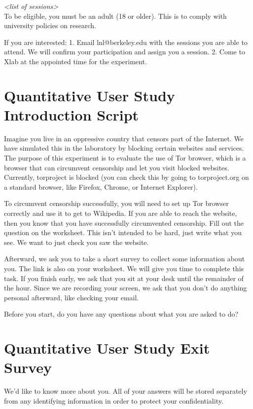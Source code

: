 \documentclass[USenglish,oneside,twocolumn]{article}
\begin{document}
\textit{<list of sessions>}\\

To be eligible, you must be an adult (18 or older). This is to comply with university policies on research. 

If you are interested: 1. Email lnl@berkeley.edu with the sessions you are able to attend. We will confirm your participation and assign you a session. 2. Come to Xlab at the appointed time for the experiment.

\section{Quantitative User Study Introduction Script} 
\label{quantitative-script} 
Imagine you live in an oppressive country that censors part of the Internet. We have simulated this in the laboratory by blocking certain websites and services.  The purpose of this experiment is to evaluate the use of Tor browser, which is a browser that can circumvent censorship and let you visit blocked websites. Currently, torproject is blocked (you can check this by going to torproject.org on a standard browser, like Firefox, Chrome, or Internet Explorer). 

To circumvent censorship successfully, you will need to set up Tor browser correctly and use it to get to Wikipedia. If you are able to reach the website, then you know that you have successfully circumvented censorship. Fill out the question on the worksheet. This isn't intended to be hard, just write what you see. We want to just check you saw the website. 

Afterward, we ask you to take a short survey to collect some information about you. The link is also on your worksheet.
We will give you time to complete this task. If you finish early, we ask that you sit at your desk until the remainder of the hour. Since we are recording your screen, we ask that you don't do anything personal afterward, like checking your email.

Before you start, do you have any questions about what you are asked to do? 

\section{Quantitative User Study Exit Survey} 
\label{quantitative-exit-survey}
We'd like to know more about you.  All of your answers will be stored separately from any identifying information in order to protect your confidentiality.
\end{document}
